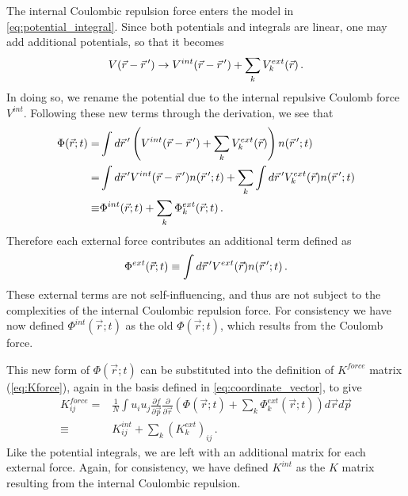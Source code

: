 The internal Coulombic repulsion force enters the model in \ref{eq:potential_integral}.
Since both potentials and integrals are linear, one may add additional potentials, so that it becomes
\begin{equation}
  V(\vec{r} - \vec{r}\,^{\prime}) \rightarrow V^{int}(\vec{r} - \vec{r}\,^{\prime}) + \sum_{k} V_{k}^{ext}(\vec{r}) \,\text{.}
\end{equation}
In doing so, we rename the potential due to the internal repulsive Coulomb force $V^{int}$.
Following these new terms through the derivation, we see that
\begin{equation}
  \begin{split}
    \Phi(\vec{r};t) = & \int d\vec{r}\,^{\prime} \left( V^{int}(\vec{r} - \vec{r}\,^{\prime}) + \sum_{k} V_{k}^{ext}(\vec{r}) \right) n(\vec{r}\,^{\prime}; t) \\
    = & \int d\vec{r}\,^{\prime} V^{int}(\vec{r} - \vec{r}\,^{\prime}) n(\vec{r}\,^{\prime}; t) + \sum_{k} \int d\vec{r}\,^{\prime} V_{k}^{ext}(\vec{r}) n(\vec{r}\,^{\prime}; t) \\
    \equiv & \Phi^{int}(\vec{r};t) + \sum_{k} \Phi_{k}^{ext}(\vec{r};t) \,\text{.}
  \end{split}
\end{equation}
Therefore each external force contributes an additional term defined as
\begin{equation}
  \Phi^{ext}(\vec{r};t) \equiv \int d\vec{r}\,^{\prime} V^{ext}(\vec{r}) n(\vec{r}\,^{\prime}; t) \,\text{.}
\end{equation}
These external terms are not self-influencing, and thus are not subject to the complexities of the internal Coulombic repulsion force.
For consistency we have now defined $\Phi^{int}(\vec{r};t)$ as the old $\Phi(\vec{r};t)$, which results from the Coulomb force. 

This new form of $\Phi(\vec{r};t)$ can be substituted into the definition of $K^{force}$ matrix (\ref{eq:Kforce}), again in the basis defined in \ref{eq:coordinate_vector}, to give
\begin{equation}
  \begin{split}
    K^{force}_{ij} = & \frac{1}{N} \int u_i u_j \frac{\partial f}{\partial \vec{p}} \frac{\partial}{\partial \vec{r}} \left( \Phi(\vec{r};t) + \sum_{k} \Phi_{k}^{ext}(\vec{r};t) \right) d\vec{r} d\vec{p} \\
    \equiv & K^{int}_{ij} + \sum_{k} (K_{k}^{ext})_{ij} \,\text{.}
  \end{split}
\end{equation}
Like the potential integrals, we are left with an additional matrix for each external force.
Again, for consistency, we have defined $K^{int}$ as the $K$ matrix resulting from the internal Coulombic repulsion.

